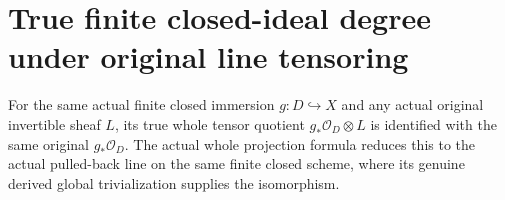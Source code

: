 \section{True finite closed-ideal degree under original line tensoring}

\begin{definition}
\label{def:fc-finite-closed-line-twisted-quotient}
\leanok
{}
For the same actual finite closed immersion $g:D\hookrightarrow X$ and
any actual original invertible sheaf $L$, its true whole tensor quotient
$g_*\mathcal O_D\otimes L$ is identified with the same original
$g_*\mathcal O_D$. The actual whole projection formula reduces this to
the actual pulled-back line on the same finite closed scheme, where its
genuine derived global trivialization supplies the isomorphism.
\end{definition}

